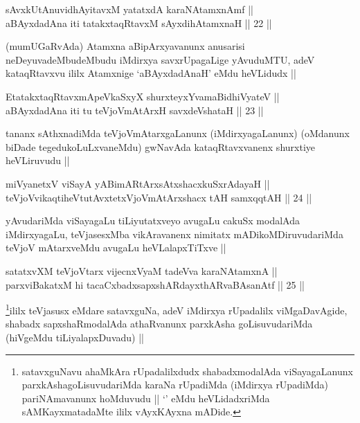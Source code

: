 \begin{shl}
sAvxkUtAnuvidhAyitavxM yatatxdA karaNAtamxnAmf || \\
aBAyxdadAna iti tatakxtaqRtavxM sAyxdihA\s \s tamxnaH ||  22 ||  
\end{shl}

\begin{artha}
(mumUGaRvAda) Atamxna aBipArxyavanunx anusarisi neDeyuvadeMbudeMbudu
  iMdirxya savxrUpagaLige yAvuduMTU, adeV kataqRtavxvu ililx Atamxnige
  `aBAyxdadAnaH' eMdu heVLidudx ||
\end{artha}

\begin{shl}
EtatakxtaqRtavxmApeVkaSxyX shurxteyxYvamaBidhiVyateV || \\
aBAyxdadAna iti tu teVjoVmAtArxH savxdeVshataH ||  23 ||  
\end{shl}

\begin{artha}
tananx sAthxnadiMda teVjoVmAtarxgaLanunx (iMdirxyagaLanunx) (oMdanunx
biDade tegedukoLuLxvaneMdu) gwNavAda kataqRtavxvanenx shurxtiye
heVLiruvudu || 
\end{artha}


\begin{shl}
miVyanetxV viSayA yABimARtArxsAtxshacxkuSxrAdayaH || \\
teVjoVvikaqtiheVtutAvxtetxVjoVmAtArxshacx tAH samxqqtAH ||  24 ||  
\end{shl}

\begin{artha}
yAvudariMda viSayagaLu tiLiyutatxveyo avugaLu cakuSx modalAda
iMdirxyagaLu, teVjasesxMba vikAravanenx nimitatx mADikoMDiruvudariMda
teVjoV mAtarxveMdu avugaLu heVLalapxTiTxve ||
\end{artha}


\begin{shl}
satatxvXM teVjoV\s tarx vijecnxVyaM tadeVva karaNAtamxnA || \\
parxviBakatxM hi tacaCxbadxsapxshARdayxthARvaBAsanAtf ||  25 ||  
\end{shl}

\begin{artha}
\footnote[1]{satavxguNavu ahaMkAra rUpadalilxdudx shabadxmodalAda
  viSayagaLanunx parxkAshagoLisuvudariMda karaNa rUpadiMda (iMdirxya
  rUpadiMda) pariNAmavanunx hoMduvudu || `\stext' eMdu heVLidadxriMda
  sAMKayxmatadaMte ililx vAyxKAyxna mADide.}ililx teVjasusx eMdare satavxguNa, adeV iMdirxya
rUpadalilx viMgaDavAgide, shabadx sapxshaRmodalAda athaRvanunx
parxkAsha goLisuvudariMda (hiVgeMdu tiLiyalapxDuvadu) ||
\end{artha}

